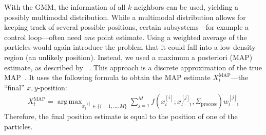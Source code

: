 \documentclass[11pt]{report}
\DeclareMathOperator*{\argmax}{arg\,max}
\begin{document}
With the GMM, the information of all $k$ neighbors can be used,
yielding a possibly multimodal distribution. While a multimodal
distribution allows for keeping track of several possible positions,
certain subsystems---for example a control loop---often need
\emph{one} point estimate. Using a weighted average of the particles
would again introduce the problem that it could fall into a low
density region (an unlikely position). Instead, we used a maximum a
posteriori (MAP) estimate, as described by
\citeauthor{driessen2008map}~\cite{driessen2008map}. This approach is
a discrete approximation of the true MAP~\cite{driessen2008map}. It
uses the following formula to obtain the MAP estimate
$X_t^{\text{MAP}}$---the ``final'' $x,y$-position:
\begin{align}
X_t^{\text{MAP}} = \argmax_{x_t^{[i]} \in \{i=1,\ldots,M\}} \sum_{j =
  1}^{M}f(x_t^{[i]} ; x_{t-1}^{[j]},\Sigma_{\text{process}})w_{t-1}^{[j]}
\end{align}
Therefore, the final position estimate is equal to the position of one
of the particles.
\end{document}
